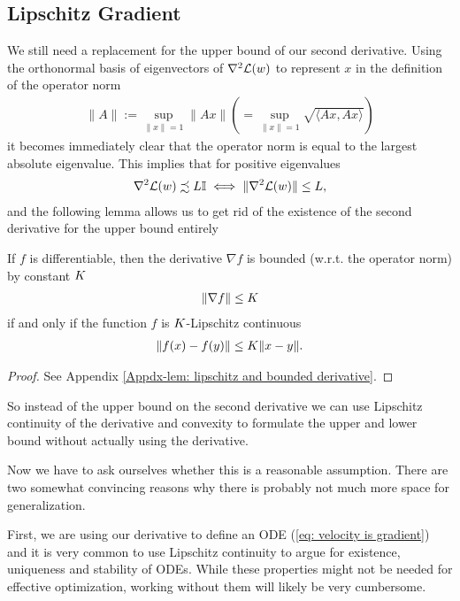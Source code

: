 \subsection{Lipschitz Gradient}

We still need a replacement for the upper bound of our second derivative.
Using the orthonormal basis of eigenvectors of
\(\nabla^2 \mathcal{L}(w)\) to represent \(x\) in the definition of the operator norm
%
\begin{align*}
	\|A\| := \sup_{\|x\| =1} \|Ax\|
	\left(= \sup_{\|x\| =1} \sqrt{\langle Ax, Ax\rangle}\right)
\end{align*}
%
it becomes immediately clear that the operator norm is equal to the largest
absolute eigenvalue. This implies that for positive eigenvalues 
%
\begin{align}
	\label{eq: operator norm upper bound relation}
	\nabla^2 \mathcal{L}(w) \precsim L\mathbb{I}
	\iff \|\nabla^2 \mathcal{L}(w)\|\le L,
\end{align}
%
and the following lemma allows us to get rid of the existence of the second
derivative for the upper bound entirely
%
\begin{lemma}\label{lem: lipschitz and bounded derivative}
	If \(f\) is differentiable, then the derivative \(\nabla f\) is
	bounded (w.r.t. the operator norm) by constant \(K\)
	\begin{align*}
		\|\nabla f\| \le K 
	\end{align*}	
	if and only if the function
	\(f\) is \(K\)-Lipschitz continuous
	\begin{align*}
		\|f(x) - f(y)\| \le K \|x-y\|.
	\end{align*}
\end{lemma}
\begin{proof}
	See Appendix \ref{Appdx-lem: lipschitz and bounded derivative}.
\end{proof}
%
\noindent
So instead of the upper bound on the second derivative we can use Lipschitz
continuity of the derivative and convexity to formulate the upper and lower
bound without actually using the derivative.

Now we have to ask ourselves whether this  is a reasonable assumption. There
are two somewhat convincing reasons why there is probably not much more space
for generalization.

First, we are using our derivative to define an ODE (\ref{eq: velocity is
gradient}) and it is very common to use Lipschitz continuity to argue for
existence, uniqueness and stability of ODEs. While these properties might not
be needed for effective optimization, working without them will likely be very
cumbersome.

